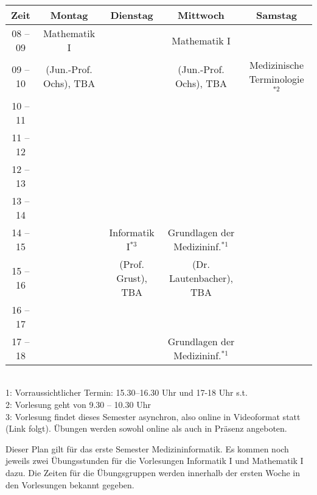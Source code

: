 \begin{minipage}{\textwidth}
    \footnotesize
\begin{center}
\begin{tabular}{|c|c|c|c|c|} 
	\hline
	Zeit    & Montag       & Dienstag             & Mittwoch                          & Samstag                           \\ 
	\hline\hline
	08 – 09 & Mathematik I &                      & Mathematik I                      &                                   \\ 
	\cline{1-1}\cline{3-3}\cline{5-5}
	09 – 10 & (Jun.-Prof. Ochs), TBA      &                      & (Jun.-Prof. Ochs), TBA                           & Medizinische Terminologie$^{*2}$  \\ 
	\hline
	10 – 11 &              &                      &                                   &                                   \\ 
	\cline{1-1}\cline{3-5}
	11 – 12 &              &                      &                                   &                                   \\ 
	\hline
	12 – 13 &              &                      &                                   &                                   \\ 
	\hline
	13 – 14 &              &                      &                                   &                                   \\ 
	\hline
	14 – 15 &              & Informatik I$^{*3}$  & Grundlagen der Medizininf.$^{*1}$ &                                   \\ 
	\cline{1-2}\cline{4-5}
	15 – 16 &              & (Prof. Grust), TBA              & (Dr. Lautenbacher), TBA           &                                   \\ 
	\cline{1-3}\cline{5-5}
	16 – 17 &              &                      &                                   &                                   \\ 
	\hline
	17 – 18 &              &                      & Grundlagen der Medizininf.$^{*1}$ &                                   \\
	\hline
\end{tabular}
    ~\\
\scriptsize %
1: Vorraussichtlicher Termin: 15.30--16.30 Uhr und 17-18 Uhr s.t.\\
2: Vorlesung geht von 9.30 -- 10.30 Uhr\\
3: Vorlesung findet dieses Semester asynchron, also online in Videoformat statt (Link folgt). Übungen werden sowohl online als auch in Präsenz angeboten.
\end{center}
\end{minipage}
Dieser Plan gilt für das erste Semester Medizininformatik. Es kommen noch jeweils zwei Übungsstunden für die Vorlesungen 
Informatik I und Mathematik I dazu. Die Zeiten für die Übungsgruppen werden innerhalb der ersten Woche in den Vorlesungen bekannt gegeben.
